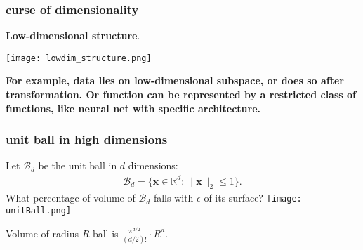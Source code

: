 \documentclass[compress]{beamer}
\newcommand{\bv}[1]{\mathbf{#1}}
\newcommand{\R}{\mathbb{R}}
\begin{document}
\begin{frame}[t]
	\frametitle{curse of dimensionality}
	\begin{center}
		\alert{\textbf{Low-dimensional structure}}. 
		\vspace{1em}
		
		\texttt{[image: lowdim\_structure.png]}
		\vspace{1em}
		
		\textbf{For example, data lies on low-dimensional subspace, or does so after transformation. Or function can be represented by a restricted class of functions, like neural net with specific architecture.}
	\end{center}
\end{frame}

%	
%
%	
%	

\begin{frame}[t]
	\frametitle{unit ball in high dimensions}
	Let $\mathcal{B}_d$ be the unit ball in $d$ dimensions: \begin{align*}\mathcal{B}_d = \{\bv{x}\in \R^d: \|\bv{x}\|_2 \leq 1\}.\end{align*}
	\alert{What percentage of volume of $\mathcal{B}_d$ falls with $\epsilon$ of its surface?}
		\texttt{[image: unitBall.png]}
		
	Volume of radius $R$ ball is $\frac{\pi^{d/2}}{(d/2)!}\cdot R^d$. 
\end{frame}
\end{document}
